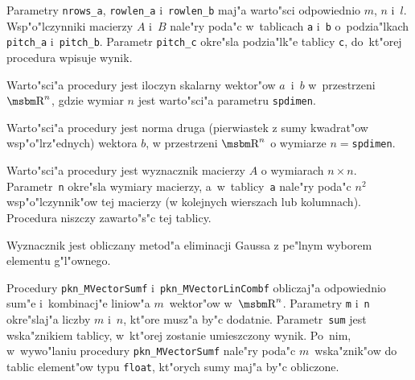 Parametry \texttt{nrows\_a}, \texttt{rowlen\_a} i~\texttt{rowlen\_b}
maj"a warto"sci odpowiednio $m$, $n$ i~$l$. Wsp"o"lczynniki macierzy $A$ i~$B$
nale"ry poda"c w~tablicach \texttt{a} i~\texttt{b} o~podzia"lkach \texttt{pitch\_a}
i~\texttt{pitch\_b}. Parametr \texttt{pitch\_c} okre"sla podzia"lk"e tablicy
\texttt{c}, do~kt"orej procedura wpisuje wynik.

\vspace{\bigskipamount}


\vspace{\bigskipamount}
Warto"sci"a procedury jest iloczyn skalarny wektor"ow
$a$~i~$b$ w~przestrzeni $\R^n$, gdzie wymiar $n$ jest warto"sci"a parametru
\texttt{spdimen}.

\vspace{\bigskipamount}
Warto"sci"a procedury jest norma druga (pierwiastek z sumy kwadrat"ow
wsp"o"lrz"ednych) wektora $b$, w przestrzeni $\R^n$ o wymiarze
$n=$\texttt{spdimen}.

\vspace{\bigskipamount}
Warto"sci"a procedury jest wyznacznik macierzy $A$ o wymiarach $n\times n$.
Parametr~\texttt{n} okre"sla wymiary macierzy, a~w~tablicy~\texttt{a}
nale"ry poda"c $n^2$ wsp"o"lczynnik"ow tej macierzy (w kolejnych wierszach
lub kolumnach). Procedura niszczy zawarto"s"c tej tablicy.

Wyznacznik jest obliczany metod"a eliminacji Gaussa z pe"lnym wyborem
elementu g"l"ownego.

\vspace{\bigskipamount}
Procedury \texttt{pkn\_MVectorSumf} i~\texttt{pkn\_MVectorLinCombf} obliczaj"a
odpowiednio sum"e i~kombinacj"e liniow"a $m$~wektor"ow w~$\R^n$. Parametry
\texttt{m} i~\texttt{n} okre"slaj"a liczby $m$ i~$n$, kt"ore musz"a by"c
dodatnie. Parametr~\texttt{sum} jest wska"znikiem tablicy, w~kt"orej
zostanie umieszczony wynik. Po~nim, w~wywo"laniu procedury
\texttt{pkn\_MVectorSumf} nale"ry poda"c $m$~wska"znik"ow do tablic
element"ow typu \texttt{float}, kt"orych sumy maj"a by"c obliczone.

